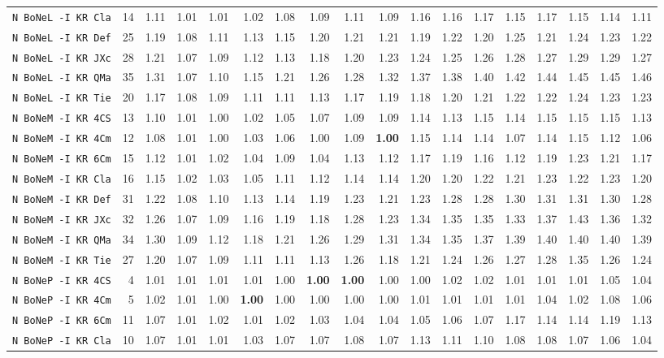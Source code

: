 \begin{tabular}{l | r r | r r r r r r r r r r r r r r r |}
\verb+N BoNeL -I KR Cla+ & 14 & 1.11 & 1.01&1.01&1.02&1.08&1.09&1.11&1.09&1.16&1.16&1.17&1.15&1.17&1.15&1.14&1.11\\
\verb+N BoNeL -I KR Def+ & 25 & 1.19 & 1.08&1.11&1.13&1.15&1.20&1.21&1.21&1.19&1.22&1.20&1.25&1.21&1.24&1.23&1.22\\
\verb+N BoNeL -I KR JXc+ & 28 & 1.21 & 1.07&1.09&1.12&1.13&1.18&1.20&1.23&1.24&1.25&1.26&1.28&1.27&1.29&1.29&1.27\\
\verb+N BoNeL -I KR QMa+ & 35 & 1.31 & 1.07&1.10&1.15&1.21&1.26&1.28&1.32&1.37&1.38&1.40&1.42&1.44&1.45&1.45&1.46\\
\verb+N BoNeL -I KR Tie+ & 20 & 1.17 & 1.08&1.09&1.11&1.11&1.13&1.17&1.19&1.18&1.20&1.21&1.22&1.22&1.24&1.23&1.23\\
\verb+N BoNeM -I KR 4CS+ & 13 & 1.10 & 1.01&1.00&1.02&1.05&1.07&1.09&1.09&1.14&1.13&1.15&1.14&1.15&1.15&1.15&1.13\\
\verb+N BoNeM -I KR 4Cm+ & 12 & 1.08 & 1.01&1.00&1.03&1.06&1.00&1.09&\textbf{1.00}&1.15&1.14&1.14&1.07&1.14&1.15&1.12&1.06\\
\verb+N BoNeM -I KR 6Cm+ & 15 & 1.12 & 1.01&1.02&1.04&1.09&1.04&1.13&1.12&1.17&1.19&1.16&1.12&1.19&1.23&1.21&1.17\\
\verb+N BoNeM -I KR Cla+ & 16 & 1.15 & 1.02&1.03&1.05&1.11&1.12&1.14&1.14&1.20&1.20&1.22&1.21&1.23&1.22&1.23&1.20\\
\verb+N BoNeM -I KR Def+ & 31 & 1.22 & 1.08&1.10&1.13&1.14&1.19&1.23&1.21&1.23&1.28&1.28&1.30&1.31&1.31&1.30&1.28\\
\verb+N BoNeM -I KR JXc+ & 32 & 1.26 & 1.07&1.09&1.16&1.19&1.18&1.28&1.23&1.34&1.35&1.35&1.33&1.37&1.43&1.36&1.32\\
\verb+N BoNeM -I KR QMa+ & 34 & 1.30 & 1.09&1.12&1.18&1.21&1.26&1.29&1.31&1.34&1.35&1.37&1.39&1.40&1.40&1.40&1.39\\
\verb+N BoNeM -I KR Tie+ & 27 & 1.20 & 1.07&1.09&1.11&1.11&1.13&1.26&1.18&1.21&1.24&1.26&1.27&1.28&1.35&1.26&1.24\\
\verb+N BoNeP -I KR 4CS+ & 4 & 1.01 & 1.01&1.01&1.01&1.00&\textbf{1.00}&\textbf{1.00}&1.00&1.00&1.02&1.02&1.01&1.01&1.01&1.05&1.04\\
\verb+N BoNeP -I KR 4Cm+ & 5 & 1.02 & 1.01&1.00&\textbf{1.00}&1.00&1.00&1.00&1.00&1.01&1.01&1.01&1.01&1.04&1.02&1.08&1.06\\
\verb+N BoNeP -I KR 6Cm+ & 11 & 1.07 & 1.01&1.02&1.01&1.02&1.03&1.04&1.04&1.05&1.06&1.07&1.17&1.14&1.14&1.19&1.13\\
\verb+N BoNeP -I KR Cla+ & 10 & 1.07 & 1.01&1.01&1.03&1.07&1.07&1.08&1.07&1.13&1.11&1.10&1.08&1.08&1.07&1.06&1.04\\

\end{tabular}
